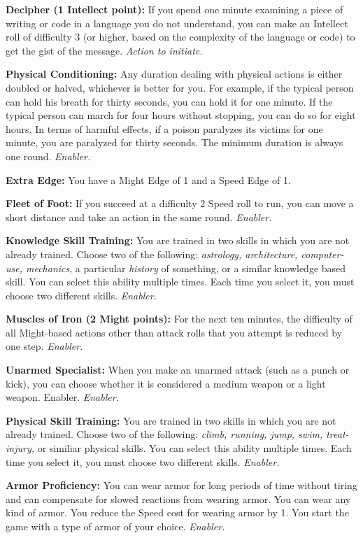 \documentclass[a4paper,10pt,final,twocolumn,oneside]{book}
\newcommand{\itemAbility}[2]{\textcolor{25gray}{\textbullet\textbf{ #1:}}{ #2}\par}
\newcommand{\enabler}{\textit{ Enabler.}}
\newcommand{\actionInit}{\textit{ Action to initiate.}}
\begin{document}
\itemAbility{Decipher (1 Intellect point)}{If you spend one minute examining a piece of writing or code in a language you do not understand, you can make an Intellect roll of difficulty 3 (or higher, based on the complexity of the language or code) to get the gist of the message.\actionInit}

\itemAbility{Physical Conditioning}{Any duration dealing with physical actions is either doubled or halved, whichever is better for you. For example, if the typical person can hold his breath for thirty seconds, you can hold it for one minute. If the typical person can march for four hours without stopping, you can do so for eight hours. In terms of harmful effects, if a poison paralyzes its victims for one minute, you are paralyzed for thirty seconds. The minimum duration is always one round.\enabler} \itemAbility{Extra Edge}{You have a Might Edge of 1 and a Speed Edge of 1.}

\itemAbility{Fleet of Foot}{If you succeed at a difficulty 2 Speed roll to run, you can move a short distance and take an action in the same round.\enabler}

\itemAbility{Knowledge Skill Training}{You are trained in two skills in which you are not already trained. Choose two of the following: \textit{astrology, architecture, computer-use, mechanics}, a particular \textit{history} of something, or a similar knowledge based skill. You can select this ability multiple times. Each time you select it, you must choose two different skills.\enabler}

\itemAbility{Muscles of Iron (2 Might points)}{For the next ten minutes, the difficulty of all Might-based actions other than attack rolls that you attempt is reduced by one step.\enabler}

\itemAbility{Unarmed Specialist}{When you make an unarmed attack (such as a punch or kick), you can choose whether it is considered a medium weapon or a light weapon. Enabler.\enabler}

\itemAbility{Physical Skill Training}{You are trained in two skills in which you are not already trained. Choose two of the following: \textit{climb, running, jump, swim, treat-injury,} or similiar physical skills. You can select this ability multiple times. Each time you select it, you must choose two different skills.\enabler}

\itemAbility{Armor Proficiency}{You can wear armor for long periods of time without tiring and can compensate for slowed reactions from wearing armor. You can wear any kind of armor. You reduce the Speed cost for wearing armor by 1. You start the game with a type of armor of your choice.\enabler}
\end{document}
